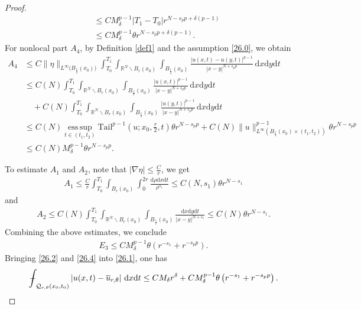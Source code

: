 \documentclass[reqno,10pt]{amsart}
\numberwithin{equation}{section}
\newcommand{ \mint }{ {\int\hspace{-0.38cm}-}}
\begin{document}
\begin{proof}
\begin{align*}
		&\le CM_\delta^{p-1}|T_1-T_0|r^{N-s_pp+\delta(p-1)}\\
		&\le CM_\delta^{p-1}\theta r^{N-s_pp+\delta(p-1)}.
	\end{align*}
	For nonlocal part $A_4$, by Definition \ref{def1} and the assumption \eqref{26.0}, we obtain
	\begin{align*}
		A_4&\le C\|\eta\|_{L^\infty\bigl(B_{\frac{r}{2}}(x_0)\bigl)}\int_{T_0}^{T_1}\int_{\mathbb{R}^N\backslash B_r(x_0)}\int_{B_{\frac{r}{2}}(x_0)}\frac{\left| u(x,t)-u(y,t)\right|^{p-1}}{|x-y|^{N+s_pp}}\,\mathrm{d}x\mathrm{d}y\mathrm{d}t\\
		&\le C(N)\int_{T_0}^{T_1}\int_{\mathbb{R}^N\backslash B_r(x_0)}\int_{B_{\frac{r}{2}}(x_0)}\frac{|u(x,t)|^{p-1}}{|x-y|^{N+s_pp}}\,\mathrm{d}x\mathrm{d}y\mathrm{d}t\\
		&\quad+C(N)\int_{T_0}^{T_1}\int_{\mathbb{R}^N\backslash B_r(x_0)}\int_{B_{\frac{r}{2}}(x_0)}\frac{|u(y,t)|^{p-1}}{|x-y|^{N+s_pp}}\,\mathrm{d}x\mathrm{d}y\mathrm{d}t\\
		&\le C(N)\operatorname*{ess\,sup}_{t\in(t_1,t_2)}\mathrm{Tail}^{p-1}\left(u;x_0,\frac{r}{2},t\right)\theta r^{N-s_pp}+C(N)\|u\|^{p-1}_{L^\infty\left(B_{\frac{r}{2}}(x_0)\times(t_1,t_2)\right) }\theta r^{N-s_pp}\\
		&\le C(N)M^{p-1}_{\delta}\theta r^{N-s_pp}.
	\end{align*}
	
	To estimate $A_1$ and $A_2$, note that $|\nabla\eta|\le \frac{C}{r}$, we get
	\begin{align*}
		A_1\le \frac{C}{r}\int_{T_0}^{T_1}\int_{B_r(x_0)}\int_{0}^{2r}\frac{\mathrm{d}\rho\mathrm{d}x\mathrm{d}t}{\rho^{s_1}}\le C(N,s_1)\theta r^{N-s_1}
	\end{align*}
	and
	\begin{align*}
		A_2\le C(N)\int_{T_0}^{T_1}\int_{\mathbb{R}^N\backslash B_r(x_0)}\int_{B_{\frac{r}{2}}(x_0)}\frac{\mathrm{d}x\mathrm{d}y\mathrm{d}t}{|x-y|^{N+s_1}}\le C(N)\theta r^{N-s_1}.
	\end{align*}
	Combining the above estimates, we conclude
	\begin{align}
		\label{26.4}
		E_3\le CM_\delta^{p-1}\theta \left( r^{-s_1}+r^{-s_pp}\right).
	\end{align}
	Bringing \eqref{26.2} and \eqref{26.4} into \eqref{26.1}, one has 
	\begin{align}
		\label{26.5}
		\mint_{\mathcal{Q}_{r,\theta}(x_0, t_0)}\left|u(x,t)-\overline{u}_{r,\theta}\right|\,\mathrm{d}x\mathrm{d}t\le CM_{\delta}r^\delta+CM_\delta^{p-1}\theta \left( r^{-s_1}+r^{-s_pp}\right).
	\end{align}
	

\end{proof}
\end{document}
